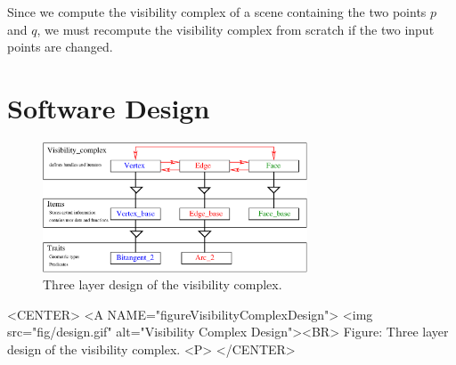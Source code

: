 Since we compute the visibility complex of a scene containing the two points $p$
and $q$, we must recompute the visibility complex from scratch if the two input
points are changed.

\section{Software Design}
\begin{ccTexOnly}
  \begin{figure}
    \begin{center}
      \parbox{0.7\textwidth}{%
          \includegraphics[width=0.7\textwidth]{fig/design.eps}%
      }
    \end{center}
    \caption{Three layer design of the visibility complex.}
    \label{figureVisibilityComplexDesign}
  \end{figure}
\end{ccTexOnly}

\begin{ccHtmlOnly}
    <CENTER>
    <A NAME="figureVisibilityComplexDesign">
        <img src="fig/design.gif"
         alt="Visibility Complex Design"><BR>
    Figure: Three layer design of the visibility complex.
    <P>
    </CENTER>
\end{ccHtmlOnly}


